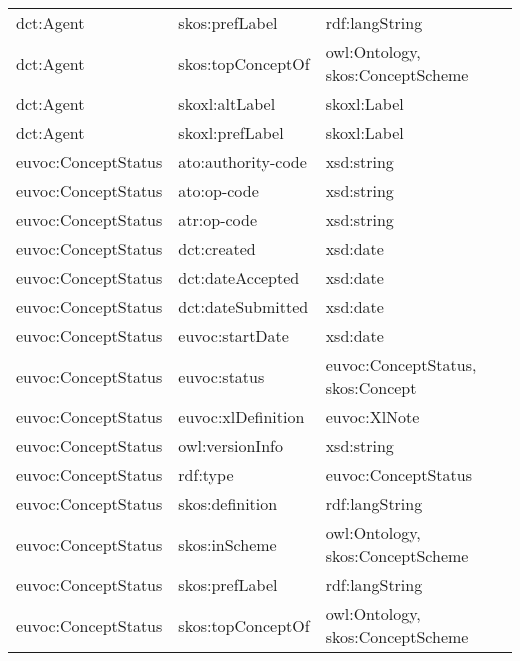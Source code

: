 \documentclass[10pt,a4paper,titlepage,final]{article}
\begin{document}
\begin{longtable}{lll}
           dct:Agent &          skos:prefLabel &                                     rdf:langString \\
           dct:Agent &       skos:topConceptOf &                   owl:Ontology, skos:ConceptScheme \\
           dct:Agent &          skoxl:altLabel &                                        skoxl:Label \\
           dct:Agent &         skoxl:prefLabel &                                        skoxl:Label \\
 euvoc:ConceptStatus &      ato:authority-code &                                         xsd:string \\
 euvoc:ConceptStatus &             ato:op-code &                                         xsd:string \\
 euvoc:ConceptStatus &             atr:op-code &                                         xsd:string \\
 euvoc:ConceptStatus &             dct:created &                                           xsd:date \\
 euvoc:ConceptStatus &        dct:dateAccepted &                                           xsd:date \\
 euvoc:ConceptStatus &       dct:dateSubmitted &                                           xsd:date \\
 euvoc:ConceptStatus &         euvoc:startDate &                                           xsd:date \\
 euvoc:ConceptStatus &            euvoc:status &                  euvoc:ConceptStatus, skos:Concept \\
 euvoc:ConceptStatus &      euvoc:xlDefinition &                                       euvoc:XlNote \\
 euvoc:ConceptStatus &         owl:versionInfo &                                         xsd:string \\
 euvoc:ConceptStatus &                rdf:type &                                euvoc:ConceptStatus \\
 euvoc:ConceptStatus &         skos:definition &                                     rdf:langString \\
 euvoc:ConceptStatus &           skos:inScheme &                   owl:Ontology, skos:ConceptScheme \\
 euvoc:ConceptStatus &          skos:prefLabel &                                     rdf:langString \\
 euvoc:ConceptStatus &       skos:topConceptOf &                   owl:Ontology, skos:ConceptScheme \\

\end{longtable}
\end{document}
